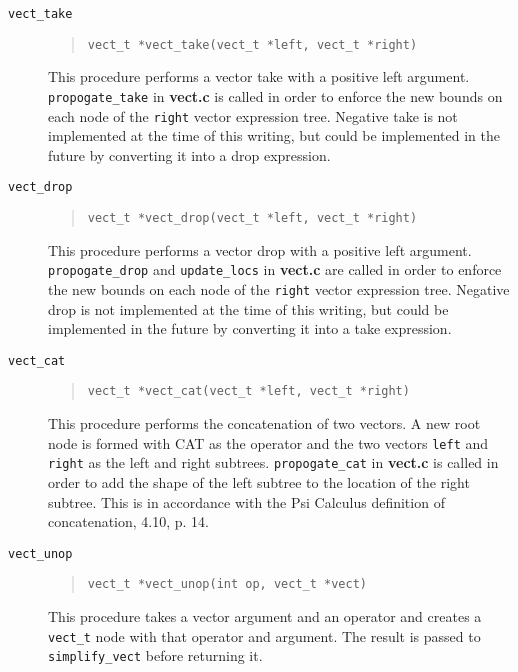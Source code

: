 \begin{description}
\item[{\tt vect\_take}]
\begin{quote}
\begin{verbatim}
vect_t *vect_take(vect_t *left, vect_t *right)
\end{verbatim}
\end{quote}
This procedure performs a vector take with a positive left argument.
{\tt propogate\_take} in {\bf vect.c} is called in order to enforce
the new bounds on each node of the {\tt right} vector expression
tree.
Negative take is not implemented at the time of this writing, but could
be implemented in the future by converting it into a drop expression.

\item[{\tt vect\_drop}]
\begin{quote}
\begin{verbatim}
vect_t *vect_drop(vect_t *left, vect_t *right)
\end{verbatim}
\end{quote}
This procedure performs a vector drop with a positive left argument.
{\tt propogate\_drop} and {\tt update\_locs} in {\bf vect.c} are called
in order to enforce the new bounds on each node of the {\tt right} vector
expression tree.
Negative drop is not implemented at the time of this writing, but could
be implemented in the future by converting it into a take expression.

\item[{\tt vect\_cat}]
\begin{quote}
\begin{verbatim}
vect_t *vect_cat(vect_t *left, vect_t *right)
\end{verbatim}
\end{quote}
 This procedure performs the concatenation of two
vectors.  A new root node is formed with CAT as the operator and the
two vectors {\tt left} and {\tt right} as the left and right subtrees.
{\tt propogate\_cat} in {\bf vect.c} is called in order to add the
shape of the left subtree to the location of the right subtree.  This is
in accordance with the Psi Calculus definition of concatenation, 4.10, p. 14.

\item[{\tt vect\_unop}]
\begin{quote}
\begin{verbatim}
vect_t *vect_unop(int op, vect_t *vect)
\end{verbatim}
\end{quote}
This procedure takes a vector argument and an operator
and creates a {\tt vect\_t} node with that operator and argument.  The
result is passed to {\tt simplify\_vect} before returning it.


\end{description}
